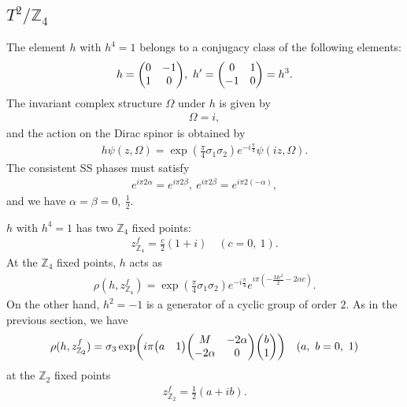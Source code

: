 \documentclass[11pt]{article}
\newcommand{\fix}[1]{\textcolor{red}{[#1]}}
\begin{document}

\subsection{ $T^2/ \mathbb{Z}_4$}
The element $h$ with $h^4=1$ belongs to a conjugacy class of the following elements:
\begin{align}
    h=\mqty(0 & -1 \\ 1 & 0 ),~h^\prime=\mqty(0 & 1 \\ -1 & 0 )=h^3. 
\end{align}
The invariant complex structure $\Omega$ under $h$ is given by
\begin{align}
    \Omega=i,
\end{align}
and the action on the Dirac spinor is obtained by
\begin{align}
    h\psi(z,\Omega)= \exp(\frac{\pi}{4} \sigma_1 \sigma_2)e^{-i\frac{\pi}{4}} \psi( iz,\Omega).
\end{align}
The consistent SS phases must satisfy
\begin{align}
    e^{i\pi 2 \alpha}= e^{i\pi 2 \beta} ,~e^{i\pi 2 \beta}= e^{i\pi 2 (-\alpha)},
\end{align}
and we have $\alpha=\beta=0,~\frac{1}{2}$.

$h$ with $h^4=1$ has two $\mathbb{Z}_4$ fixed points:
\begin{align}
    z^f_{\mathbb{Z}_4}=\frac{c}{2}(1+i) \quad (c=0,~1).
\end{align}
At the ${\mathbb{Z}_4}$ fixed points, $h$ acts as 
\begin{align}
    \rho(h,z^f_{\mathbb{Z}_4})=\exp(\frac{\pi}{4} \sigma_1 \sigma_2)e^{-i\frac{\pi}{4}} e^{i \pi \left(- \frac{M c^{2}}{2} - 2 \alpha c\right)}.
\end{align}
On the other hand, $h^2=-1$ is a generator of a cyclic group of order $2$. As in the previous section, we have
\begin{align}
    \rho(h,z^f_{\mathbb{Z}_2})=\sigma_3 \exp( i \pi \mqty(a & 1) \mqty( M & -2 \alpha \\ -2 \alpha & 0 ) \mqty(b \\ 1))\quad (a,~b=0,~1)
\end{align}
at the $\mathbb{Z}_2$ fixed points
\begin{align}
    z^f_{\mathbb{Z}_2}=\frac{1}{2}(a+ib).
\end{align}
\end{document}
